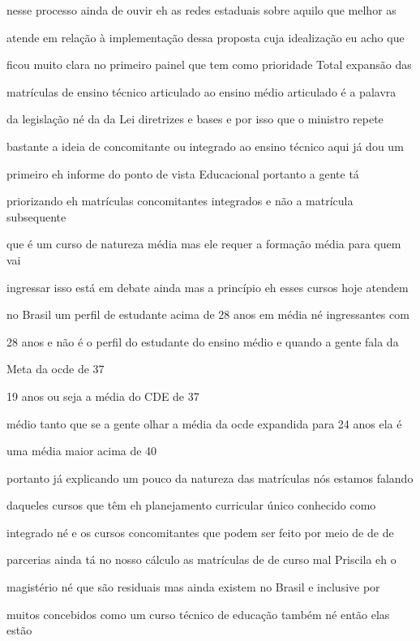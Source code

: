 \documentclass[a4paper,12pt]{article}
\begin{document}
nesse processo ainda de ouvir eh as redes estaduais sobre aquilo que melhor as

atende em relação à implementação dessa proposta cuja idealização eu acho que

ficou muito clara no primeiro painel que tem como prioridade Total expansão das

matrículas de ensino técnico articulado ao ensino médio articulado é a palavra

da legislação né da da Lei diretrizes e bases e por isso que o ministro repete

bastante a ideia de concomitante ou integrado ao ensino técnico aqui já dou um

primeiro eh informe do ponto de vista Educacional portanto a gente tá

priorizando eh matrículas concomitantes integrados e não a matrícula subsequente

que é um curso de natureza média mas ele requer a formação média para quem vai

ingressar isso está em debate ainda mas a princípio eh esses cursos hoje atendem

no Brasil um perfil de estudante acima de 28 anos em média né ingressantes com

28 anos e não é o perfil do estudante do ensino médio e quando a gente fala da

Meta da ocde de 37%

19 anos ou seja a média do CDE de 37%

médio tanto que se a gente olhar a média da ocde expandida para 24 anos ela é

uma média maior acima de 40%

portanto já explicando um pouco da natureza das matrículas nós estamos falando

daqueles cursos que têm eh planejamento curricular único conhecido como

integrado né e os cursos concomitantes que podem ser feito por meio de de de

parcerias ainda tá no nosso cálculo as matrículas de de curso mal Priscila eh o

magistério né que são residuais mas ainda existem no Brasil e inclusive por

muitos concebidos como um curso técnico de educação também né então elas estão
\end{document}
